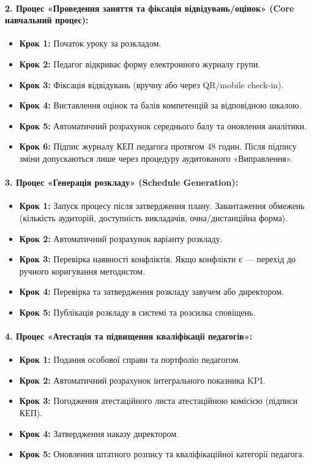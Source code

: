 \documentclass{article}
\begin{document}
\paragraph{2. Процес «Проведення заняття та фіксація відвідувань/оцінок» (Core навчальний процес):}
\begin{itemize}
    \item \textbf{Крок 1:} Початок уроку за розкладом.
    \item \textbf{Крок 2:} Педагог відкриває форму електронного журналу групи.
    \item \textbf{Крок 3:} Фіксація відвідувань (вручну або через QR/mobile check-in).
    \item \textbf{Крок 4:} Виставлення оцінок та балів компетенцій за відповідною шкалою.
    \item \textbf{Крок 5:} Автоматичний розрахунок середнього балу та оновлення аналітики.
    \item \textbf{Крок 6:} Підпис журналу КЕП педагога протягом 48 годин. Після підпису зміни допускаються лише через процедуру аудитованого «Виправлення».
\end{itemize}

\paragraph{3. Процес «Генерація розкладу» (Schedule Generation):}
\begin{itemize}
    \item \textbf{Крок 1:} Запуск процесу після затвердження плану. Завантаження обмежень (кількість аудиторій, доступність викладачів, очна/дистанційна форма).
    \item \textbf{Крок 2:} Автоматичний розрахунок варіанту розкладу.
    \item \textbf{Крок 3:} Перевірка наявності конфліктів. Якщо конфлікти є --- перехід до ручного коригування методистом.
    \item \textbf{Крок 4:} Перевірка та затвердження розкладу завучем або директором.
    \item \textbf{Крок 5:} Публікація розкладу в системі та розсилка сповіщень.
\end{itemize}

\paragraph{4. Процес «Атестація та підвищення кваліфікації педагогів»:}
\begin{itemize}
    \item \textbf{Крок 1:} Подання особової справи та портфоліо педагогом.
    \item \textbf{Крок 2:} Автоматичний розрахунок інтегрального показника KPI.
    \item \textbf{Крок 3:} Погодження атестаційного листа атестаційною комісією (підписи КЕП).
    \item \textbf{Крок 4:} Затвердження наказу директором.
    \item \textbf{Крок 5:} Оновлення штатного розпису та кваліфікаційної категорії педагога.
\end{itemize}
\end{document}
